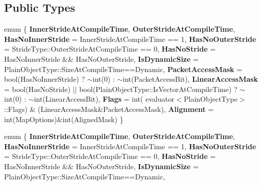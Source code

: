 \subsection*{Public Types}
\begin{DoxyCompactItemize}
\item 
\mbox{\label{struct_eigen_1_1internal_1_1evaluator_3_01_map_3_01_plain_object_type_00_01_map_options_00_01_stride_type_01_4_01_4_a73be270f81cb8d3e4a771046522225f2}} 
enum \{ \newline
{\bfseries Inner\+Stride\+At\+Compile\+Time}, 
{\bfseries Outer\+Stride\+At\+Compile\+Time}, 
{\bfseries Has\+No\+Inner\+Stride} = Inner\+Stride\+At\+Compile\+Time == 1, 
{\bfseries Has\+No\+Outer\+Stride} = Stride\+Type\+:\+:Outer\+Stride\+At\+Compile\+Time == 0, 
\newline
{\bfseries Has\+No\+Stride} = Has\+No\+Inner\+Stride \&\& Has\+No\+Outer\+Stride, 
{\bfseries Is\+Dynamic\+Size} = Plain\+Object\+Type\+:\+:Size\+At\+Compile\+Time==Dynamic, 
{\bfseries Packet\+Access\+Mask} = bool(Has\+No\+Inner\+Stride) ? $\sim$int(0) \+: $\sim$int(Packet\+Access\+Bit), 
{\bfseries Linear\+Access\+Mask} = bool(Has\+No\+Stride) $\vert$$\vert$ bool(Plain\+Object\+Type\+:\+:Is\+Vector\+At\+Compile\+Time) ? $\sim$int(0) \+: $\sim$int(Linear\+Access\+Bit), 
\newline
{\bfseries Flags} = int( evaluator$<$Plain\+Object\+Type$>$\+:\+:Flags) \& (Linear\+Access\+Mask\&Packet\+Access\+Mask), 
{\bfseries Alignment} = int(Map\+Options)\&int(Aligned\+Mask)
 \}
\item 
\mbox{\label{struct_eigen_1_1internal_1_1evaluator_3_01_map_3_01_plain_object_type_00_01_map_options_00_01_stride_type_01_4_01_4_a225659c0af88c245fae91134ac46e543}} 
enum \{ \newline
{\bfseries Inner\+Stride\+At\+Compile\+Time}, 
{\bfseries Outer\+Stride\+At\+Compile\+Time}, 
{\bfseries Has\+No\+Inner\+Stride} = Inner\+Stride\+At\+Compile\+Time == 1, 
{\bfseries Has\+No\+Outer\+Stride} = Stride\+Type\+:\+:Outer\+Stride\+At\+Compile\+Time == 0, 
\newline
{\bfseries Has\+No\+Stride} = Has\+No\+Inner\+Stride \&\& Has\+No\+Outer\+Stride, 
{\bfseries Is\+Dynamic\+Size} = Plain\+Object\+Type\+:\+:Size\+At\+Compile\+Time==Dynamic, 
$$
\end{DoxyCompactItemize}
